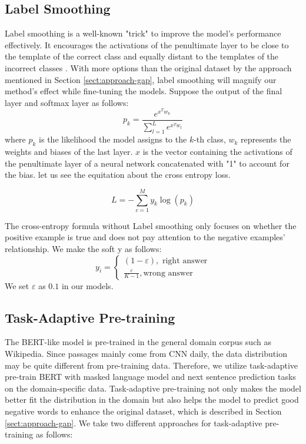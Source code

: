 \documentclass[11pt,a4paper]{article}
\begin{document}
\subsection{Label Smoothing}
\label{sec_label}
Label smoothing is a well-known "trick" to improve the model's performance effectively. 
It encourages the activations of the penultimate layer to be close to the template of the correct class and equally distant to the templates of the incorrect classes \cite{muller_when_2020}. 
With more options than the original dataset by the approach mentioned in Section \ref{sect:approach-gap}, label smoothing will magnify our method's effect while fine-tuning the models.
Suppose the output of the final layer and softmax layer as follows:
\begin{equation}
p_{k}=\frac{e^{x^{T}w_{k}} }{\sum_{l=1}^{L} e^{x^{T} w_{l}}}
\end{equation}
where $p_k$ is the likelihood the model assigns to the $k$-th class, $w_k$ represents the weights and biases of the last layer.
$x$ is the vector containing the activations of the penultimate layer of a neural network concatenated with "1" to account for the bias.
let us see the equitation about the  cross entropy loss.

\begin{equation}
L = -\sum_{c=1}^{M} y_{k} \log \left(p_{k}\right)
\end{equation}

The cross-entropy formula without Label smoothing only focuses on whether the positive example is true and does not pay attention to the negative examples' relationship.
We make the soft y as follows:
\begin{equation}
y_{i}=\left\{\begin{array}{l}
(1-\varepsilon), \mbox{  right answer} \\
\frac{\varepsilon}{K-1}, \mbox{wrong answer}
\end{array}\right.
\end{equation}
We set $\varepsilon$ as $0.1$ in our models.

\subsection{Task-Adaptive Pre-training}
\label{sec_pretrain}
The BERT-like model is pre-trained in the general domain corpus such as Wikipedia. 
Since passages mainly come from CNN daily, the data distribution may be quite different from pre-training data.
Therefore, we utilize task-adaptive pre-train BERT with masked language model and next sentence prediction tasks on the domain-specific data. 
Task-adaptive pre-training not only makes the model better fit the distribution in the domain but also helps the model to predict good negative words to enhance the original dataset, which is described in Section \ref{sect:approach-gap}. 
We take two different approaches for task-adaptive pre-training as follows:
\end{document}
